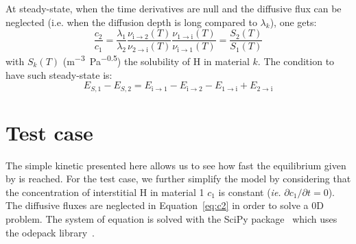 \indent At steady-state, when the time derivatives are null and the diffusive flux can be neglected (i.e. when the diffusion depth is long compared to $\lambda_k$), one gets:
\begin{equation}
     \frac{c_2}{c_1}=\frac{\lambda_1}{\lambda_2}\frac{\nu_\mathrm{i\rightarrow2}(T)}{\nu_\mathrm{2\rightarrow i}(T)}\frac{\nu_\mathrm{1\rightarrow i}(T)}{\nu_\mathrm{i\rightarrow 1}(T)} = \frac{S_2(T)}{S_1(T)}
\end{equation}
with $S_k(T)$ (\si{m^{-3}.Pa^{-0.5}}) the solubility of H in material $k$.
The condition to have such steady-state is:
\begin{equation}
    E_{S,1}-E_{S,2} = E_\mathrm{i\rightarrow 1}-E_\mathrm{i\rightarrow 2}-E_\mathrm{1\rightarrow i} +E_\mathrm{2\rightarrow i}
    \label{eq:steady}
\end{equation}

\section{Test case}
\indent The simple kinetic presented here allows us to see how fast the equilibrium given by  is reached.
For the test case, we further simplify the model by considering that the concentration of interstitial H in material 1 $c_1$ is constant (\textit{ie.} $\partial c_1/\partial t=0$).
The diffusive fluxes are neglected in Equation~\ref{eq:c2} in order to solve a 0D problem.
The system of equation is solved with the SciPy package~\cite{virtanen_scipy_2020} which uses the odepack library~\cite{hindmarch_odepack_1982}.\\

